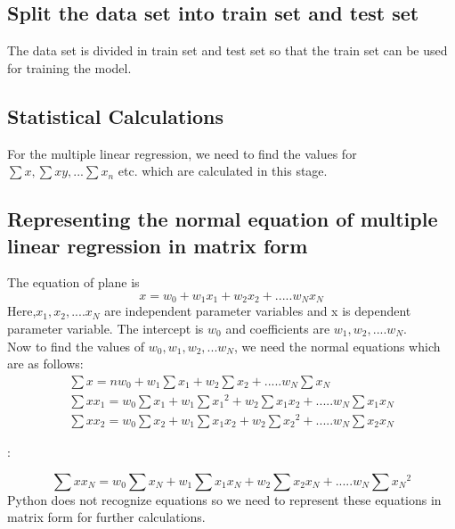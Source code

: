 \subsection{Split the data set into train set and test set}
The data set is divided in train set and test set so that the train set can be used for training the model.
\subsection{Statistical Calculations}
For the multiple linear regression, we need to find the values for $\sum{x},\sum{xy},...\sum{x_{n}}$ etc. which are calculated in this stage.
\subsection{Representing the normal equation of multiple linear regression in matrix form}
The equation of plane is
\begin{equation}
x=w_{0}+w_{1}x_{1}+w_{2}x_{2}+.....w_{N}x_{N}
\end{equation}
Here,$ x_{1},x_{2},....x_{N}$ are independent parameter variables and x is dependent parameter variable. The intercept is $w_{0}$ and coefficients are $w_{1},w_{2},....w_{N}$.\\
Now to find the values of $w_{0},w_{1},w_{2},...w_{N}$, we need the normal equations which are as follows:
\begin{eqnarray}
\sum{x}= nw_{0}+w_{1}\sum{x_{1}}+w_{2}\sum{x_{2}}+.....w_{N}\sum{x_{N}}\\
\sum{x x_{1}}= w_{0}\sum{x_{1}}+w_{1}\sum{x_{1}}^2+w_{2}\sum{x_{1}x_{2}}+.....w_{N}\sum{x_{1}x_{N}}\\
\sum{x x_{2}}= w_{0}\sum{x_{2}}+w_{1}\sum{x_{1}x_{2}}+w_{2}\sum{x_{2}}^2+.....w_{N}\sum{x_{2}x_{N}}
\end{eqnarray}
\begin{center}
:
\end{center}
\begin{equation}
\sum{x x_{N}}= w_{0}\sum{x_{N}}+w_{1}\sum{x_{1}x_{N}}+w_{2}\sum{x_{2}x_{N}}+.....w_{N}\sum{x_{N}}^2
\end{equation}
Python does not recognize equations so we need to represent these equations in matrix form for further calculations.
